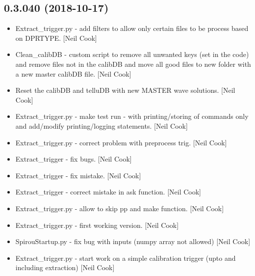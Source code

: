 \documentclass[a4paper,10pt,english]{report}
\begin{document}
\subsection{0.3.040 (2018-10-17)}
\label{\detokenize{misc/changelog:id288}}\begin{itemize}
\item {} 
Extract\_trigger.py - add filters to allow only certain files to be
process based on DPRTYPE. {[}Neil Cook{]}

\item {} 
Clean\_calibDB - custom script to remove all unwanted keys (set in the
code) and remove files not in the calibDB and move all good files to
new folder with a new master calibDB file. {[}Neil Cook{]}

\item {} 
Reset the calibDB and telluDB with new MASTER wave solutions. {[}Neil
Cook{]}

\item {} 
Extract\_trigger.py - make test run - with printing/storing of commands
only and add/modify printing/logging statements. {[}Neil Cook{]}

\item {} 
Extract\_trigger.py - correct problem with preprocess trig. {[}Neil Cook{]}

\item {} 
Extract\_trigger - fix bugs. {[}Neil Cook{]}

\item {} 
Extract\_trigger - fix mistake. {[}Neil Cook{]}

\item {} 
Extract\_trigger - correct mistake in ask function. {[}Neil Cook{]}

\item {} 
Extract\_trigger.py - allow to skip pp and make function. {[}Neil Cook{]}

\item {} 
Extract\_trigger.py - first working version. {[}Neil Cook{]}

\item {} 
SpirouStartup.py - fix bug with inputs (numpy array not allowed) {[}Neil
Cook{]}

\item {} 
Extract\_trigger.py - start work on a simple calibration trigger (upto
and including extraction) {[}Neil Cook{]}

\end{itemize}
\end{document}
